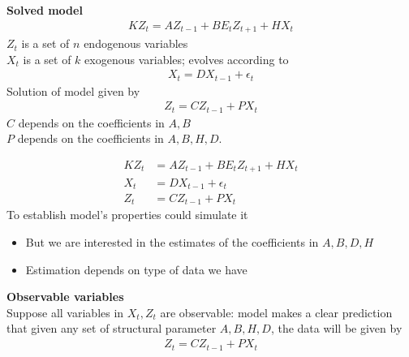 \documentclass{beamer}
\begin{document}
\begin{frame}
  \textbf{Solved model}  
\begin{align}  
  KZ_t = AZ_{t-1} + BE_tZ_{t+1} + HX_t 
\end{align}
$Z_t$ is a set of $n$ endogenous variables\\
$X_t$ is a set of $k$ exogenous variables; evolves according to 
\begin{align}
  X_t=DX_{t-1}+\epsilon_t
\end{align}
\medskip
Solution of model given by
\begin{align}  
  Z_t=CZ_{t-1}+PX_t 
\end{align}
$C$ depends on the coefficients in $A,B$\\
$P$ depends on the coefficients in $A,B,H,D$.
\end{frame}

\begin{frame}
 \begin{align*}  
 KZ_t &= AZ_{t-1} + BE_tZ_{t+1} + HX_t\\
 X_t&=DX_{t-1}+\epsilon_t\\  
 Z_t&=CZ_{t-1}+PX_t 
\end{align*}
 To establish model's properties could simulate it
 \begin{itemize}
   \item But we are interested in the estimates of the coefficients in $A, B, D, H$
   \item Estimation depends on type of data we have
 \end{itemize} 
\end{frame}


\begin{frame}
  \textbf{Observable variables}\\
  Suppose all variables in $X_t,Z_t$ are observable: model makes a clear prediction that given any set of structural parameter $A,B,H,D$, the data will be given by
\begin{align*}  
  Z_t=CZ_{t-1}+PX_t 
\end{align*}
\end{frame}
\end{document}
